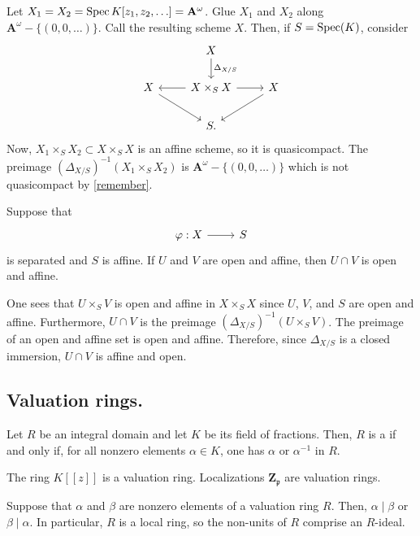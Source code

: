 \documentclass [11 pt, oneside] {article}
\begin{document}
\begin{example}[ ]\label{}\text{}
Let $X_1=X_2 = \operatorname{Spec} K[z_1,z_2,\hdots]= \mathbf{A}^\omega$. Glue $X_1$ and $X_2$ along $\mathbf{A}^\omega - \{(0,0,\hdots) \}$. Call the resulting scheme $X$. Then, if $S=\operatorname{Spec} (K)$, consider 
\[
\begin{tikzcd}
	&X \ar[d, "\Delta_{X/S}"]\\
	X\ar[dr] & X\times_SX \ar[l]\ar[r] & X\ar[dl]\\
		 & S.
\end{tikzcd}
\]
Now, $X_1\times_S X_2\subset X\times_S X$ is an affine scheme, so it is quasicompact. The preimage $(\Delta_{X/S}) ^{-1} (X_1\times_S X_2)$ is $\mathbf{A}^\omega - \{(0,0,\hdots) \}$ which is not quasicompact by \cref{remember}. 
\end{example}

Suppose that
\[
\begin{tikzcd}
\varphi :X\ar[r]& S
\end{tikzcd}
\] 
is separated and $S$ is affine. If $U$ and $V$ are open and affine, then $U\cap V$ is open and affine.

One sees that $U\times_SV$ is open and affine in $X\times_SX$ since $U$, $V$, and $S$ are open and affine. Furthermore, $U\cap V$ is the preimage $(\Delta_{X/S}) ^{-1} (U\times_S V)$. The preimage of an open and affine set is open and affine. Therefore, since $\Delta_{X/S}$ is a closed immersion, $U\cap V$ is affine and open.

\subsection{Valuation rings.}
Let $R$ be an integral domain and let $K$ be its field of fractions. Then, $R$ is a  if and only if, for all nonzero elements $\alpha\in K$, one has $\alpha$ or $\alpha^{-1}$ in $R$.

\begin{example}\label{}\text{}
The ring $K [\![z]\!]$ is a valuation ring. Localizations $\mathbf{Z}_{\mathfrak{p}}$ are valuation rings.
\end{example}

Suppose that $\alpha$ and $\beta$ are nonzero elements of a valuation ring $R$. Then, $\alpha\mid \beta$ or $\beta\mid \alpha$. In particular, $R$ is a local ring, so the non-units of $R$ comprise an $R$-ideal.
\end{document}

